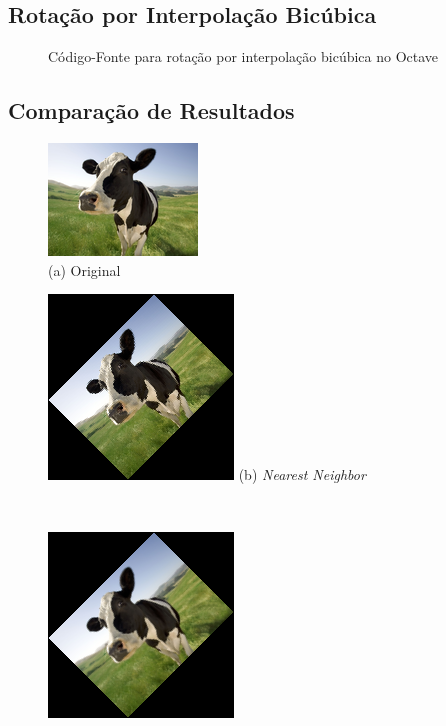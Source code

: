 \documentclass[12pt]{article}
\begin{document}
\subsection{Rotação por Interpolação Bicúbica}\label{sec:rotacao:bicubica}

\begin{figure}[H]

\caption{Código-Fonte para rotação por interpolação bicúbica no Octave}
\label{lst:rotate:bicubic}
\end{figure}

\subsection{Comparação de Resultados}\label{sec:rotacao:comparacao}

\begin{figure}[H]
    \begin{minipage}{.45\textwidth}
        \centering
        \includegraphics{cow_very_small}
        \\
        (a) Original
    \end{minipage}%
    \begin{minipage}{.45\textwidth}
        \centering
        \includegraphics{cow_nearest_rotated}
        (b) \textit{Nearest Neighbor}
    \end{minipage}
    \\
    \begin{minipage}{.45\textwidth}
        \centering
        \includegraphics{cow_bilinear_rotated}

\end{minipage}
\end{figure}
\end{document}
